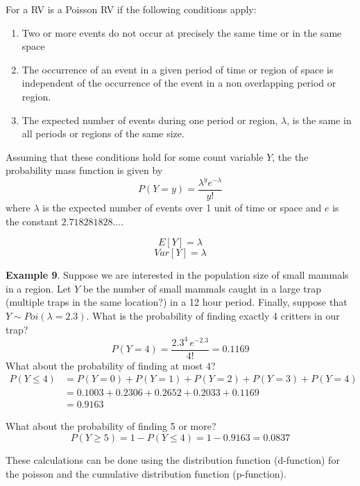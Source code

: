 \documentclass[]{book}
\providecommand{\tightlist}{%
  \setlength{\itemsep}{0pt}\setlength{\parskip}{0pt}}
\begin{document}
For a RV is a Poisson RV if the following conditions apply:

\begin{enumerate}
\def\labelenumi{\arabic{enumi}.}
\tightlist
\item
  Two or more events do not occur at precisely the same time or in the
  same space
\item
  The occurrence of an event in a given period of time or region of
  space is independent of the occurrence of the event in a non
  overlapping period or region.
\item
  The expected number of events during one period or region,
  \(\lambda\), is the same in all periods or regions of the same size.
\end{enumerate}

Assuming that these conditions hold for some count variable \(Y\), the
the probability mass function is given by
\[P(Y=y)=\frac{\lambda^{y}e^{-\lambda}}{y!}\] where \(\lambda\) is the
expected number of events over 1 unit of time or space and \(e\) is the
constant \(2.718281828\dots\).

\[E[Y]  =   \lambda\] \[Var[Y]    =   \lambda\]

\textbf{Example 9}. Suppose we are interested in the population size of
small mammals in a region. Let \(Y\) be the number of small mammals
caught in a large trap (multiple traps in the same location?) in a 12
hour period. Finally, suppose that \(Y\sim Poi(\lambda=2.3)\). What is
the probability of finding exactly 4 critters in our trap?
\[P(Y=4)    =   \frac{2.3^{4}\,e^{-2.3}}{4!} =  0.1169\] What about the
probability of finding at most 4? \[\begin{aligned} P(Y\le4) 
  &=    P(Y=0)+P(Y=1)+P(Y=2)+P(Y=3)+P(Y=4) \\
    &=  0.1003+0.2306+0.2652+0.2033+0.1169 \\
    &=  0.9163 \end{aligned}\]

What about the probability of finding 5 or more?
\[P(Y\ge5)  =   1-P(Y\le4) =    1-0.9163 =  0.0837\]

These calculations can be done using the distribution function
(d-function) for the poisson and the cumulative distribution function
(p-function).
\end{document}
